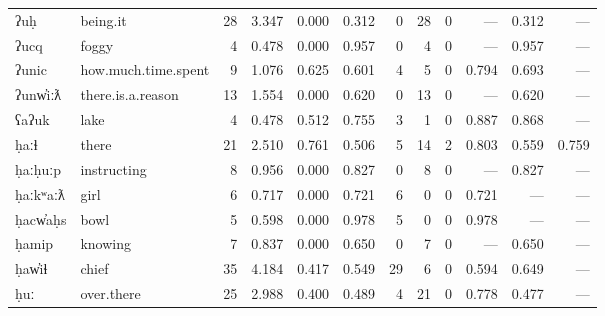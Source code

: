 \begin{landscape}
\begin{longtable}[c]{ l l | r r c c | r r r | r r r }
  ʔuḥ                & being.it                  & 28  & 3.347                     & 0.000           & 0.312      & 0         & 28          & 0            & —         & 0.312       & —\\
  ʔucq               & foggy                     & 4   & 0.478                     & 0.000           & 0.957      & 0         & 4           & 0            & —         & 0.957       & —\\
  ʔunic              & how.much.time.spent       & 9   & 1.076                     & 0.625           & 0.601      & 4         & 5           & 0            & 0.794     & 0.693       & —\\
  ʔunw̓iːƛ            & there.is.a.reason         & 13  & 1.554                     & 0.000           & 0.620      & 0         & 13          & 0            & —         & 0.620       & —\\
  ʕaʔuk              & lake                      & 4   & 0.478                     & 0.512           & 0.755      & 3         & 1           & 0            & 0.887     & 0.868       & —\\
  ḥaːɬ               & there                     & 21  & 2.510                     & 0.761           & 0.506      & 5         & 14          & 2            & 0.803     & 0.559       & 0.759\\
  ḥaːḥuːp            & instructing               & 8   & 0.956                     & 0.000           & 0.827      & 0         & 8           & 0            & —         & 0.827       & —\\
  ḥaːkʷaːƛ           & girl                      & 6   & 0.717                     & 0.000           & 0.721      & 6         & 0           & 0            & 0.721     & —           & —\\
  ḥacw̓aḥs            & bowl                      & 5   & 0.598                     & 0.000           & 0.978      & 5         & 0           & 0            & 0.978     & —           & —\\
  ḥamip              & knowing                   & 7   & 0.837                     & 0.000           & 0.650      & 0         & 7           & 0            & —         & 0.650       & —\\
  ḥaw̓iɬ              & chief                     & 35  & 4.184                     & 0.417           & 0.549      & 29        & 6           & 0            & 0.594     & 0.649       & —\\
  ḥuː                & over.there                & 25  & 2.988                     & 0.400           & 0.489      & 4         & 21          & 0            & 0.778     & 0.477       & —\\

\end{longtable}
\end{landscape}

